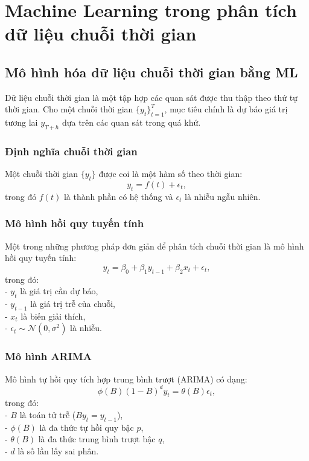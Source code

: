 \chapter{Machine Learning trong phân tích dữ liệu chuỗi thời gian}
\section{Mô hình hóa dữ liệu chuỗi thời gian bằng ML}

Dữ liệu chuỗi thời gian là một tập hợp các quan sát được thu thập theo thứ tự thời gian. Cho một chuỗi thời gian $\{y_t\}_{t=1}^{T}$, mục tiêu chính là dự báo giá trị tương lai $y_{T+h}$ dựa trên các quan sát trong quá khứ.

\subsection{Định nghĩa chuỗi thời gian}
Một chuỗi thời gian $\{y_t\}$ được coi là một hàm số theo thời gian:
\begin{equation}
    y_t = f(t) + \epsilon_t,
\end{equation}
trong đó $f(t)$ là thành phần có hệ thống và $\epsilon_t$ là nhiễu ngẫu nhiên.

\subsection{Mô hình hồi quy tuyến tính}
Một trong những phương pháp đơn giản để phân tích chuỗi thời gian là mô hình hồi quy tuyến tính:
\begin{equation}
    y_t = \beta_0 + \beta_1 y_{t-1} + \beta_2 x_t + \epsilon_t,
\end{equation}
trong đó: \\
- $y_t$ là giá trị cần dự báo, \\
- $y_{t-1}$ là giá trị trễ của chuỗi, \\ 
- $x_t$ là biến giải thích, \\ 
- $\epsilon_t \sim \mathcal{N}(0, \sigma^2)$ là nhiễu.

\subsection{Mô hình ARIMA}
Mô hình tự hồi quy tích hợp trung bình trượt (ARIMA) có dạng:
\begin{equation}
    \phi(B) (1 - B)^d y_t = \theta(B) \epsilon_t,
\end{equation}
trong đó: \\
- $B$ là toán tử trễ ($B y_t = y_{t-1}$), \\
- $\phi(B)$ là đa thức tự hồi quy bậc $p$, \\
- $\theta(B)$ là đa thức trung bình trượt bậc $q$, \\
- $d$ là số lần lấy sai phân.

